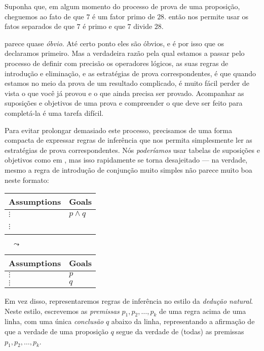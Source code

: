 \begin{example}
\label{exSevenDividesTwentyEightConjunctionAssumption}
Suponha que, em algum momento do processo de prova de uma proposição, cheguemos ao fato de que $7$ é um fator primo de $28$.  então nos permite usar os fatos separados de que $7$ é primo e que $7$ divide $28$.
\end{example}

 parece quase \textit{óbvio}. Até certo ponto eles são óbvios, e é por isso que os declaramos primeiro. Mas a verdadeira razão pela qual estamos a passar pelo processo de definir com precisão os operadores lógicos, as suas regras de introdução e eliminação, e as estratégias de prova correspondentes, é que quando estamos no meio da prova de um resultado complicado, é muito fácil perder de vista o que você já provou e o que ainda precisa ser provado. Acompanhar as suposições e objetivos de uma prova e compreender o que deve ser feito para completá-la é uma tarefa difícil.

Para evitar prolongar demasiado este processo, precisamos de uma forma compacta de expressar regras de inferência que nos permita simplesmente ler as estratégias de prova correspondentes. Nós \textit{poderíamos} usar tabelas de suposições e objetivos como em , mas isso rapidamente se torna desajeitado --- na verdade, mesmo a regra de introdução de conjunção muito simples \introrule{\wedge} não parece muito boa neste formato:
\begin{center}
\begin{tabular}{C{60pt}|C{60pt}}
{\small \textbf{Assumptions}} & {\small \textbf{Goals}} \\ \hline
$\vdots$ & $p \wedge q$ \\
$\vdots$ & ~
\end{tabular}
$\quad \leadsto \quad$
\begin{tabular}{C{60pt}|C{60pt}}
{\small \textbf{Assumptions}} & \small{\textbf{Goals}} \\ \hline
$\vdots$ & $p$ \\
$\vdots$ & $q$
\end{tabular}
\end{center}

Em vez disso, representaremos regras de inferência no estilo da \textit{dedução natural}. Neste estilo, escrevemos as \textit{premissas} $p_1,p_2,\dots,p_k$ de uma regra acima de uma linha, com uma única \textit{conclusão} $q$ abaixo da linha, representando a afirmação de que a verdade de uma proposição $q$ segue da verdade de (todas) as premissas $p_1,p_2,\dots,p_k$.

